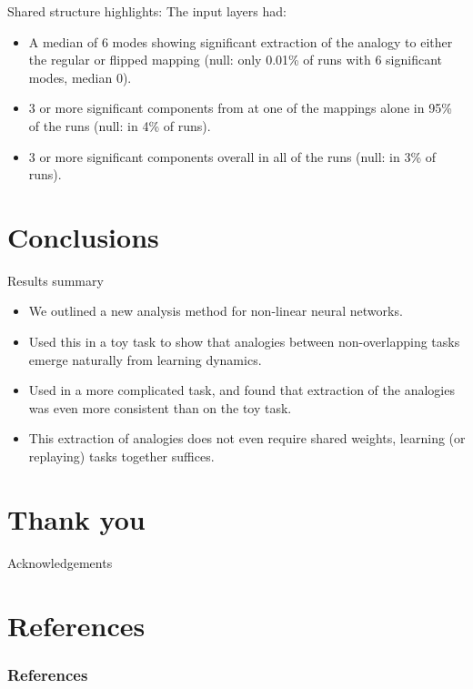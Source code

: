\documentclass{beamer}
\begin{document}
\begin{frame}{Shared structure highlights:}
The input layers had:
\begin{itemize}
    \item<1-> A median of 6 modes showing significant extraction of the analogy to either the regular or flipped mapping (null: only 0.01\% of runs with 6 significant modes, median 0).
    \item<2-> 3 or more significant components from at one of the mappings alone in 95\% of the runs (null: in 4\% of runs).
    \item<3-> 3 or more significant components overall in all of the runs (null: in 3\% of runs).
\end{itemize}
\end{frame}
\section{Conclusions}

\begin{frame}{Results summary}
\begin{itemize}
    \item<1-> We outlined a new analysis method for non-linear neural networks. 
    \item<2-> Used this in a toy task to show that analogies between non-overlapping tasks emerge naturally from learning dynamics. 
    \item<3-> Used in a more complicated task, and found that extraction of the analogies was even more consistent than on the toy task. 
    \item<4-> This extraction of analogies does not even require shared weights, learning (or replaying) tasks together suffices.
\end{itemize}
\end{frame}

\section{Thank you}
\begin{frame}{Acknowledgements}

\end{frame}

\section{References}
\begin{frame}[allowframebreaks]
\frametitle{References}


\end{frame}
\end{document}

